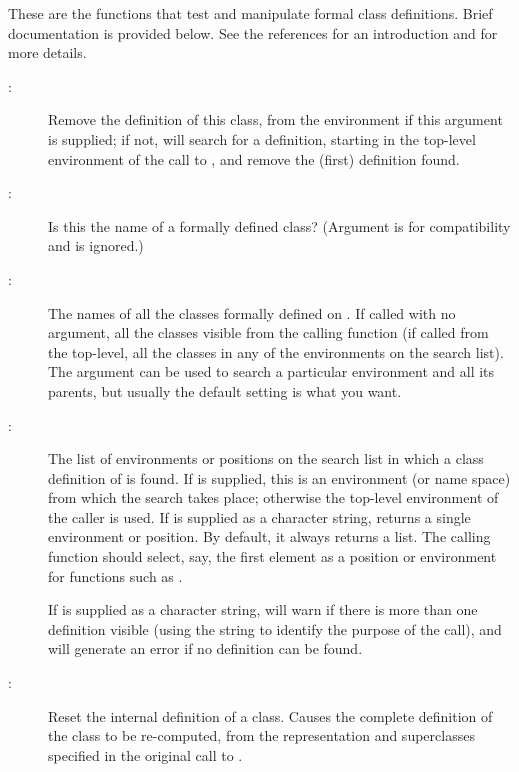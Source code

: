 \begin{Details}\relax
These are the functions that test and manipulate formal class
definitions.  Brief documentation is provided below.  See the
references for an introduction and for more details.

\begin{description}

\item[:] 
Remove the definition of this class, from the environment
 if this argument is supplied; if not,
 will search for a definition, starting in the
top-level environment of the call to , and
remove the (first) definition found.

\item[:] 
Is this the name of a formally defined class? (Argument
 is for compatibility and is ignored.)

\item[:] 
The names of all the classes formally defined on .  If
called with no argument, all the classes visible from the
calling function (if called from the top-level, all the classes
in any of the environments on the search list).  The
 argument can be used to search a particular
environment and all its parents, but usually the default setting
is what you want.

\item[:] 
The list of environments or positions on the search list in
which a class definition of  is found.  If
 is supplied, this is an environment (or name space)
from which the search takes place; otherwise the top-level
environment of the caller is used.  If  is supplied
as a character string,  returns a single
environment or position.  By default, it always returns a list.
The calling function should select, say, the first element as a
position or environment for functions such as .

If  is supplied as a character string,
 will warn if there is more than one definition
visible (using the string to identify the purpose of the call),
and will generate an error if no definition can be found.

\item[:] 
Reset the internal definition of a class.  Causes the complete
definition of the class to be re-computed, from the
representation and superclasses specified in the original
call to .


\end{description}
\end{Details}
